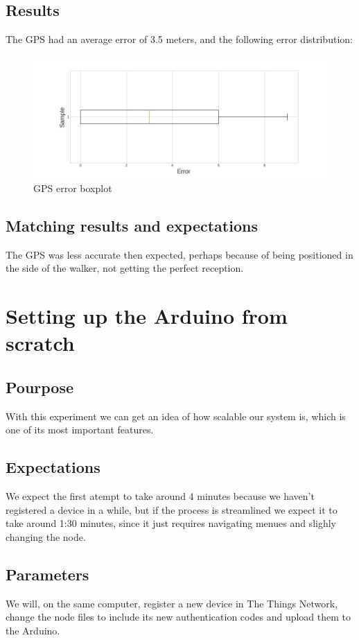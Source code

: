	\subsection{Results}
		The GPS had an average error of 3.5 meters, and the following error distribution:

		\begin{figure}[h]
			\centering
			\includegraphics[width=1.2\linewidth]{gfx/gps_boxplot_error}
			\caption{GPS error boxplot}
			\label{fig:GPS plot}
		\end{figure}

	\subsection{Matching results and expectations}
		The GPS was less accurate then expected, perhaps because of being positioned in the side of the walker, not getting the perfect reception.


\section{Setting up the Arduino from scratch}

	\subsection{Pourpose}
		With this experiment we can get an idea of how scalable our system is, which is one of its most important features.
	\subsection{Expectations}
		We expect the first atempt to take around 4 minutes because we haven't registered a device in a while, but if the process is streamlined we expect it to take around 1:30 minutes, since it just requires navigating menues and slighly changing the node.
	\subsection{Parameters}
		We will, on the same computer, register a new device in The Things Network, change the node files to include its new authentication codes and upload them to the Arduino.
